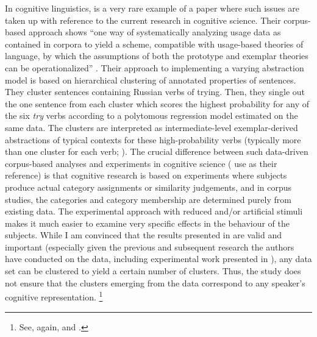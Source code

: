 In cognitive linguistics, \cite{DivjakArppe2013} is a very rare example of a paper where such issues are taken up with reference to the current research in cognitive science.
Their corpus-based approach shows ``one way of systematically analyzing usage data as contained in corpora to yield a scheme, compatible with usage-based theories of language, by which the assumptions of both the prototype and exemplar theories can be operationalized'' \citep[267]{DivjakArppe2013}.
Their approach to implementing a varying abstraction model \citep[254--260]{DivjakArppe2013} is based on hierarchical clustering of annotated properties of sentences.
They cluster sentences containing Russian verbs of trying.
Then, they single out the one sentence from each cluster which scores the highest probability for any of the six \textit{try} verbs according to a polytomous regression model estimated on the same data.
The clusters are interpreted as intermediate-level exemplar-derived abstractions of typical contexts for these high-probability verbs (typically more than one cluster for each verb; \citealp[255--256]{DivjakArppe2013}).
The crucial difference between such data-driven corpus-based analyses and experiments in cognitive science (\citealp{DivjakArppe2013} use \citealp{VerbeemenEa2007} as their reference) is that cognitive research is based on experiments where subjects produce actual category assignments or similarity judgements, and in corpus studies, the categories and category membership are determined purely from existing data.
The experimental approach with reduced and\slash or artificial stimuli makes it much easier to examine very specific effects in the behaviour of the subjects.
While I am convinced that the results presented in \citet{DivjakArppe2013} are valid and important (especially given the previous and subsequent research the authors have conducted on the data, including experimental work presented in \citealp{DivjakEa2016}), any data set can be clustered to yield a certain number of clusters.
Thus, the study does not ensure that the clusters emerging from the data correspond to any speaker's cognitive representation.%
\footnote{See, again, \citet[486--487]{Dabrowska2016} and \citet[22]{Gries2003}.}

